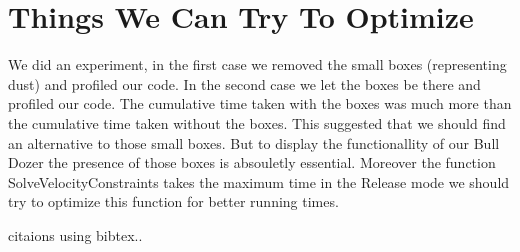 \documentclass[11pt]{article}
\begin{document}
\section{Things We Can Try To Optimize}
	We did an experiment, in the first case we removed the small boxes (representing dust) and profiled our code. In the second case we let the boxes be there and profiled our code. The cumulative time taken with the boxes was much more than the cumulative time taken without the boxes. This suggested that we should find an alternative to those small boxes. But to display the functionallity of our Bull Dozer the presence of those boxes is absouletly essential.\newline
	Moreover the function SolveVelocityConstraints takes the maximum time in the Release mode we should try to optimize this function for better running times.

citaions using bibtex..
\end{document}
